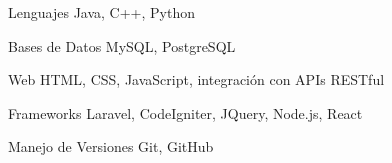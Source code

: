 

\begin{cvskills}

  \cvskill
    {Lenguajes} %
    {Java, C++, Python} %

  \cvskill
    {Bases de Datos} %
    {MySQL, PostgreSQL} %

    \cvskill
    {Web} %
    {HTML, CSS, JavaScript, integración con APIs RESTful}

    \cvskill
    {Frameworks} %
    {Laravel, CodeIgniter, JQuery, Node.js, React}

    \cvskill
    {Manejo de Versiones} %
    { Git, GitHub}
\end{cvskills}
